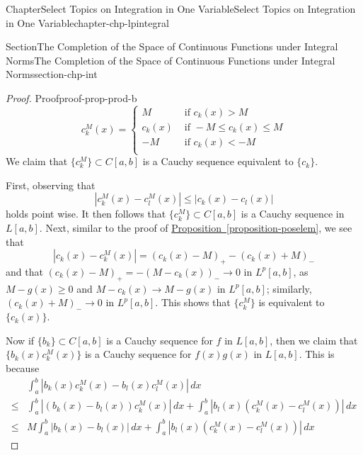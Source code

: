 \documentclass[oneside,10pt,]{book}
\newcommand{\xreffont}{\relax}
\numberwithin{equation}{section}
\newcommand{\amp}{&}
\begin{document}
\begin{chapterptx}{Chapter}{Select Topics on Integration in One Variable}{}{Select Topics on Integration in One Variable}{}{}{chapter-chp-lpintegral}
\begin{sectionptx}{Section}{The Completion of the Space of Continuous Functions under Integral Norms}{}{The Completion of the Space of Continuous Functions under Integral Norms}{}{}{section-chp-int}
\begin{proof}{Proof}{}{proof-prop-prod-b}
\begin{equation*}
c^{M}_{k}(x)=\begin{cases} M \amp \text{ if } c_{k}(x) > M\\
c_{k}(x) \amp \text{ if } -M \le c_{k}(x)\le M\\
-M \amp \text{ if } c_{k}(x) < -M\\
\end{cases}
\end{equation*}
We claim that \(\{ c^{M}_{k}\}\subset C[a, b]\) is a Cauchy sequence equivalent to \(\{c_{k}\}\).%
\par
First, observing that%
\begin{equation*}
|c^{M}_{k}(x)-c^{M}_{l}(x)|\le |c_{k}(x)-c_{l}(x)|
\end{equation*}
holds point wise. It then follows that  \(\{ c^{M}_{k}\}\subset C[a, b]\) is a Cauchy sequence in \(L[a, b]\). Next, similar to the proof of \hyperref[proposition-poselem]{Proposition~{\xreffont\ref{proposition-poselem}}}, we see that%
\begin{equation*}
|c_{k}(x)-c^{M}_{k}(x)| =(c_{k}(x)-M)_{+}-(c_{k}(x)+M)_{-}
\end{equation*}
and that \((c_{k}(x)-M)_{+}=-(M-c_{k}(x))_{-}\to 0\) in \(L^{p}[a, b]\), as \(M-g(x)\ge 0\) and \(M-c_{k}(x) \to M-g(x)\)  in \(L^{p}[a, b]\); similarly, \((c_{k}(x)+M)_{-} \to 0\) in \(L^{p}[a, b]\). This shows that \(\{ c^{M}_{k}\}\) is equivalent to \(\{c_{k}(x)\}\).%
\par
Now if \(\{b_{k}\}\subset C[a, b]\) is a Cauchy sequence for \(f\) in \(L[a,  b]\), then we claim that \(\{b_{k}(x) c_{k}^{M}(x)\} \) is a Cauchy sequence for \(f(x)g(x)\) in \(L[a, b]\). This is because%
\begin{align*}
\amp \int_{a}^{b}|b_{k}(x)c_{k}^{M}(x)-b_{l}(x)c_{l}^{M}(x)|\, dx \\
\le \amp \int_{a}^{b}|\left( b_{k}(x)- b_{l}(x)\right)c_{k}^{M}(x)|\, dx +
\int_{a}^{b}|b_{l}(x) \left(c_{k}^{M}(x)-c_{l}^{M}(x)\right)|\, dx\\
\le \amp M \int_{a}^{b}| b_{k}(x)- b_{l}(x)|\, dx +
\int_{a}^{b}|b_{l}(x) \left(c_{k}^{M}(x)-c_{l}^{M}(x)\right)|\, dx
\end{align*}
%
\par

\end{proof}
\end{sectionptx}
\end{chapterptx}
\end{document}
